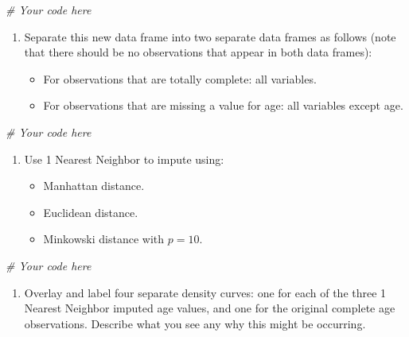 \documentclass[]{article}
\newenvironment{Shaded}{\begin{snugshade}}{\end{snugshade}}
\newcommand{\CommentTok}[1]{\textcolor[rgb]{0.56,0.35,0.01}{\textit{#1}}}
\providecommand{\tightlist}{%
  \setlength{\itemsep}{0pt}\setlength{\parskip}{0pt}}
\begin{document}
\begin{Shaded}
\begin{Highlighting}[]
\CommentTok{# Your code here}
\end{Highlighting}
\end{Shaded}

\begin{enumerate}
\def\labelenumi{\arabic{enumi}.}
\setcounter{enumi}{1}
\tightlist
\item
  Separate this new data frame into two separate data frames as follows
  (note that there should be no observations that appear in both data
  frames):

  \begin{itemize}
  \tightlist
  \item
    For observations that are totally complete: all variables.
  \item
    For observations that are missing a value for age: all variables
    except age.
  \end{itemize}
\end{enumerate}

\begin{Shaded}
\begin{Highlighting}[]
\CommentTok{# Your code here}
\end{Highlighting}
\end{Shaded}

\begin{enumerate}
\def\labelenumi{\arabic{enumi}.}
\setcounter{enumi}{2}
\tightlist
\item
  Use 1 Nearest Neighbor to impute using:

  \begin{itemize}
  \tightlist
  \item
    Manhattan distance.
  \item
    Euclidean distance.
  \item
    Minkowski distance with \(p = 10\).
  \end{itemize}
\end{enumerate}

\begin{Shaded}
\begin{Highlighting}[]
\CommentTok{# Your code here}
\end{Highlighting}
\end{Shaded}

\begin{enumerate}
\def\labelenumi{\arabic{enumi}.}
\setcounter{enumi}{3}
\tightlist
\item
  Overlay and label four separate density curves: one for each of the
  three 1 Nearest Neighbor imputed age values, and one for the original
  complete age observations. Describe what you see any why this might be
  occurring.
\end{enumerate}
\end{document}
